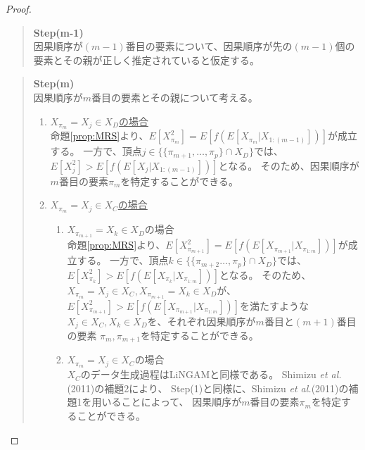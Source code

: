 \begin{proof}
\begin{quote}
\begin{enumerate}[label=(\roman*)]
\begin{enumerate}[label=(ii - \alph*)]
      \end{enumerate}

    \end{enumerate}
  \end{quote}

  \begin{quote}
    \textbf{Step(m-1)} \\
    因果順序が$(m-1)$番目の要素について、因果順序が先の$(m-1)$個の要素とその親が正しく推定されていると仮定する。
  \end{quote}

  \begin{quote}
    \textbf{Step(m)} \\
    因果順序が$m$番目の要素とその親について考える。
    \begin{enumerate}[label=(\roman*)]
      \item
      \underline{$X_{\pi_m} = X_j \in X_D$の場合} \\
      命題\ref{prop:MRS}より、$E[X_{\pi_m}^2] = E[f(E[X_{\pi_m} | X_{1:(m-1)}])]$が成立する。
      一方で、頂点$j \in \{\{ \pi_{m+1}, \dots, \pi_p\} \cap X_D\}$では、
      $E[X_j^2] > E[f(E[X_j | X_{1:(m-1)}])]$となる。
      そのため、因果順序が$m$番目の要素$\pi_m$を特定することができる。

      \item
      \underline{$X_{\pi_m} = X_j \in X_C$の場合}
      \begin{enumerate}[label=(ii - \alph*)]
        \item
        $X_{\pi_{m+1}} = X_k \in X_D$の場合 \\
        命題\ref{prop:MRS}より、$E[X_{\pi_{m+1}}^2] = E[f(E[X_{\pi_{m+1}} | X_{\pi_{1:m}}])]$が成立する。
        一方で、頂点$k \in \{\{ \pi_{m+2} \dots, \pi_{p} \} \cap X_D\}$では、
        $E[X_{\pi_{k}}^2] > E[f(E[X_{\pi_{k}} | X_{\pi_{1:m}}])]$となる。
        そのため、$X_{\pi_m} = X_j \in X_C, X_{\pi_{m+1}} = X_k \in X_D$が、
        $E[X_{\pi_{m+1}}^2] > E[f(E[X_{\pi_{m+1}} | X_{\pi_{1:m}}])]$を満たすような
        $X_j \in X_C, X_k \in X_D$を、それぞれ因果順序が$m$番目と$(m+1)$番目の要素
        $\pi_{m}, \pi_{m+1}$を特定することができる。

        \item
        $X_{\pi_m} = X_j \in X_C$の場合 \\
        $X_C$のデータ生成過程はLiNGAM\cite{Shimizu2006-yu}と同様である。
        Shimizu \textit{et al.}(2011)\cite{Shimizu2011-pd}の補題2により、
        Step(1)と同様に、Shimizu \textit{et al.}(2011)\cite{Shimizu2011-pd}の補題1を用いることによって、
        因果順序が$m$番目の要素$\pi_m$を特定することができる。


\end{enumerate}
\end{enumerate}
\end{quote}
\end{proof}
